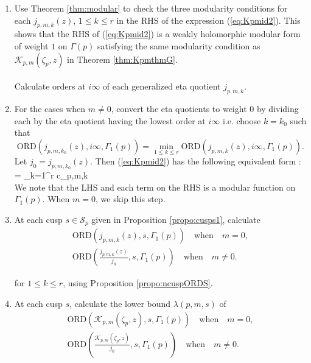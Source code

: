 \documentclass[12pt]{amsart}
\theoremstyle{definition}
\theoremstyle{remark}
\numberwithin{equation}{section}
\newcommand\ORD{\mbox{ORD}}
\newcommand\thm[1]{\ref{thm:#1}}
\newcommand\propo[1]{\ref{propo:#1}}
\newcommand\eqn[1]{(\ref{eq:#1})}
\begin{document}
\begin{enumerate}
\item[\textit{Step 1.}] Use Theorem \thm{modular} to check the three modularity conditions for each $j_{p,m,k}(z)$, $1\leq k \leq r$ in the RHS of the expression \eqn{Kpmid2}. This shows that the RHS of \eqn{Kpmid2} is a weakly holomorphic modular form of weight $1$ on $\Gamma(p)$ satisfying the same modularity condition as $\mathcal{K}_{p,m}(\zeta_{p},z)$ in Theorem \thm{KpmthmG}.\\\\
Calculate orders at $i\infty$ of each generalized eta quotient $j_{p,m,k}$.\\

\item[\textit{Step 2.}] For the cases when $m\neq 0$, convert the eta quotients to weight $0$ by dividing each by the eta quotient having the lowest order at $i \infty$ i.e. choose $k=k_0$ such that  
$$
\ORD(j_{p,m,k_0}(z),i\infty,\Gamma_1(p))
=\min\limits_{1 \leq k \leq r} \ORD(j_{p,m,k}(z),i\infty,\Gamma_1(p)).
$$ 
Let $j_0=j_{p,m,k_0}(z)$. Then \eqn{Kpmid2} has the following equivalent form : 
\beq
{}= \sum\limits_{k=1}^r c_{p,m,k}\,  
\label{eq:Kpmid3}
\eeq\\
We note that the LHS and each term on the RHS is a modular function on $\Gamma_1(p)$.
When $m=0$, we skip this step.\\
\item[\textit{Step 3.}] At each cusp $s \in \mathcal{S}_p$ given in Proposition \propo{cusps1}, calculate 
\begin{align*}
\ORD\left(j_{p,m,k}(z),s,\Gamma_1(p)\right)\quad \text{when} \quad m=0, 
\\
\ORD\left(\frac{j_{p,m,k}(z)}{j_0},s,\Gamma_1(p)\right)\quad \text{when} \quad m\neq 0.
\end{align*}

for $1\leq k \leq r$, using Proposition \propo{ncuspORDS}.

\item[\textit{Step 4.}] At each cusp $s$, calculate the lower bound $\lambda(p,m,s)$ of 
\begin{align*}
\ORD\left(\mathcal{K}_{p,m}(\zeta_{p},z),s,\Gamma_1(p)\right)\quad \text{when} \quad m=0, 
\\
\ORD\left(\frac{\mathcal{K}_{p,m}(\zeta_{p},z)}{j_0},s,\Gamma_1(p)\right)\quad \text{when} \quad m\neq 0.
\end{align*}


\end{enumerate}
\end{document}
